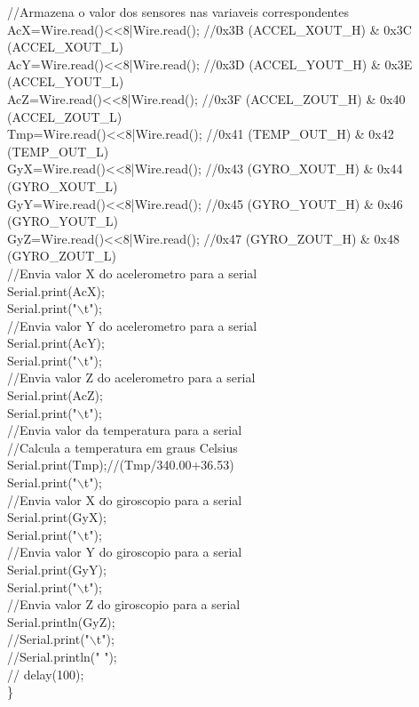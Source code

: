 \begin{anexosenv}
	//Armazena o valor dos sensores nas variaveis correspondentes\\
	AcX=Wire.read()<<8|Wire.read();  //0x3B (ACCEL\_XOUT\_H) \& 0x3C (ACCEL\_XOUT\_L)    \\ 
	AcY=Wire.read()<<8|Wire.read();  //0x3D (ACCEL\_YOUT\_H) \& 0x3E (ACCEL\_YOUT\_L)\\
	AcZ=Wire.read()<<8|Wire.read();  //0x3F (ACCEL\_ZOUT\_H) \& 0x40 (ACCEL\_ZOUT\_L)\\
	Tmp=Wire.read()<<8|Wire.read();  //0x41 (TEMP\_OUT\_H) \& 0x42 (TEMP\_OUT\_L)\\
	GyX=Wire.read()<<8|Wire.read();  //0x43 (GYRO\_XOUT\_H) \& 0x44 (GYRO\_XOUT\_L)\\
	GyY=Wire.read()<<8|Wire.read();  //0x45 (GYRO\_YOUT\_H) \& 0x46 (GYRO\_YOUT\_L)\\
	GyZ=Wire.read()<<8|Wire.read();  //0x47 (GYRO\_ZOUT\_H) \& 0x48 (GYRO\_ZOUT\_L)\\
	
	
	//Envia valor X do acelerometro para a serial\\
	Serial.print(AcX);\\
	Serial.print("$\backslash$t");\\
	
	//Envia valor Y do acelerometro para a serial\\ 
	Serial.print(AcY);\\  
	Serial.print("$\backslash$t");\\
	
	//Envia valor Z do acelerometro para a serial\\
	Serial.print(AcZ);\\
	Serial.print("$\backslash$t");\\
	
	//Envia valor da temperatura para a serial\\
	//Calcula a temperatura em graus Celsius\\
	Serial.print(Tmp);//(Tmp/340.00+36.53)\\
	Serial.print("$\backslash$t");\\
	
	//Envia valor X do giroscopio para a serial\\ 
	Serial.print(GyX);\\
	Serial.print("$\backslash$t");\\
	
	//Envia valor Y do giroscopio para a serial\\   
	Serial.print(GyY);\\
	Serial.print("$\backslash$t");\\
	
	//Envia valor Z do giroscopio para a serial\\ 
	Serial.println(GyZ);\\
	//Serial.print("$\backslash$t");\\
	//Serial.println(" ");\\
	// delay(100);\\
	
\}\\
%
\end{anexosenv}

